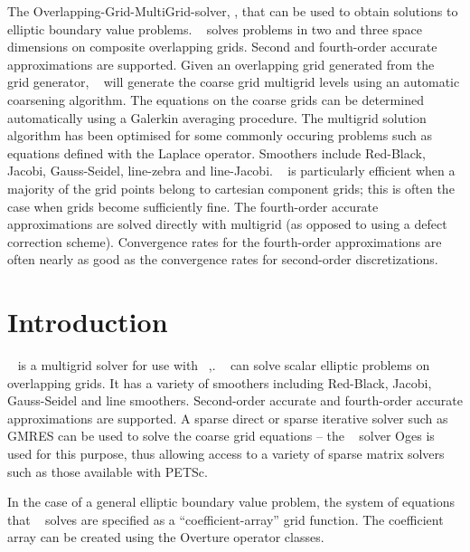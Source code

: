 \documentclass{article}
\begin{document}
\begin{flushleft}
The Overlapping-Grid-MultiGrid-solver, \Ogmg, that can be used to obtain solutions 
to elliptic boundary value problems.
\Ogmg~ solves problems in two and three space
dimensions on composite overlapping grids. 
Second and fourth-order accurate approximations are supported.
Given an overlapping grid generated from the \Ogen~  grid generator,
\Ogmg~  will generate the coarse grid multigrid levels using an automatic coarsening algorithm.
The equations on the coarse grids can be determined automatically using a Galerkin averaging
procedure.
The multigrid solution algorithm has been optimised for some commonly occuring problems such as
equations defined with the Laplace operator.
Smoothers include Red-Black, Jacobi, Gauss-Seidel, line-zebra and line-Jacobi.
\Ogmg~  is particularly efficient when a majority of the grid points belong to cartesian component grids;
this is often the case when grids become sufficiently fine.
The fourth-order accurate approximations are solved directly with multigrid (as opposed to using
a defect correction scheme). Convergence rates for the fourth-order approximations are often nearly as
good as the convergence rates for second-order discretizations.
\end{flushleft}

\clearpage
\tableofcontents



\clearpage
\section{Introduction}

\Ogmg~ is a multigrid solver for use with \Overture~\cite{overset96},\cite{OGES}.
\Ogmg~ can solve scalar elliptic problems
on overlapping grids. It has a variety of smoothers including
Red-Black, Jacobi, Gauss-Seidel and line smoothers. Second-order accurate and fourth-order
accurate approximations are supported.
A sparse direct or sparse iterative
solver such as GMRES can be used to solve the coarse grid equations --
the \Overture~ solver Oges is used for this purpose, thus allowing access to a variety of
sparse matrix solvers such as those available with PETSc\cite{PETSc}.

In the case of a general elliptic boundary value problem, 
the system of equations that \Ogmg~ solves are specified as a ``coefficient-array''
grid function. The coefficient array can be created using the Overture operator classes. 
\end{document}
